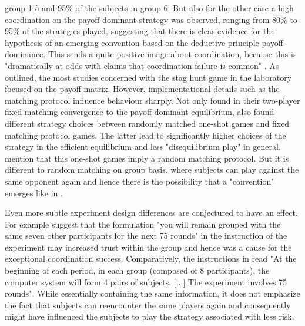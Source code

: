 \documentclass[11pt]{article}
\begin{document}
group 1-5 and 95\% of the subjects in group 6. But also for the other case a 
high coordination on the payoff-dominant strategy was observed, ranging from 
80\% to 95\% of the strategies played, suggesting that there is clear evidence
for the hypothesis of an emerging convention based on the deductive principle
payoff-dominance. This sends a quite positive image about coordination, because 
this is "dramatically at odds with claims that coordination failure is common"
\parencite[9]{devetag_when_2007}. 
As outlined, the most studies concerned with the stag hunt game in the 
laboratory focused on the payoff matrix. However, implementational details 
such as the matching protocol influence behaviour sharply. Not only 
\textcite{van_huyck_tacit_1990} found in their two-player fixed matching
convergence to the payoff-dominant equilibrium, 
\textcite{clark_repetition_2001} also found different strategy 
choices between randomly matched one-shot games and fixed matching protocol 
games. The latter lead to significantly higher choices of the strategy 
in the efficient equilibrium and less "disequilibrium play" in general. 
\textcite{devetag_when_2007} mention that this one-shot games imply a 
random matching protocol. But it is different to random matching on group
basis, where subjects can play against the same opponent again 
and hence there is the possibility that a "convention" emerges like in 
\textcite{rankin_strategic_2000}.

Even more subtle experiment design differences are conjectured to have an
effect. For example \textcite{devetag_when_2007} suggest that the formulation
"you will remain grouped with the same seven other participants for the next
75 rounds" in the instruction of the \textcite{rankin_strategic_2000} 
experiment may increased trust within the group and hence was a 
cause for the exceptional coordination success. Comparatively, the 
instructions in \textcite{dubois_optimization_2012} read "At the beginning
of each period, in each group (composed of 8 participants), the computer
system will form 4 pairs of subjects. [...] The experiment 
involves 75 rounds". While essentially containing the same information,
it does not emphasize the fact that subjects can reencounter the same 
players again and consequently might have influenced the subjects to play
the strategy associated with less risk.
\end{document}
